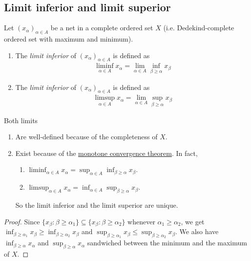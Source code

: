 \documentclass{treatise}
\begin{document}
\subsection{Limit inferior and limit superior}
Let $(x_\alpha)_{\alpha \in A}$ be a net in a complete ordered set $X$ (i.e. Dedekind-complete ordered set with maximum and minimum).
\begin{enumerate}
    \item The \emph{limit inferior} of $(x_\alpha)_{\alpha \in A}$ is defined as
    \begin{align*}
        \liminf_{\alpha \in A} x_\alpha = \lim_{\alpha \in A} \inf_{\beta \geq \alpha} x_\beta
    \end{align*}
    \item The \emph{limit inferior} of $(x_\alpha)_{\alpha \in A}$ is defined as
    \begin{align*}
        \limsup_{\alpha \in A} x_\alpha = \lim_{\alpha \in A} \sup_{\beta \geq \alpha} x_\beta
    \end{align*}
\end{enumerate}
\begin{remark}
Both limits
\begin{enumerate}
    \item Are well-defined because of the completeness of $X$.
    \item Exist because of the \hyperref[topo-ord-mono-conv]{monotone convergence theorem}. In fact,
    \begin{enumerate}
        \item $\liminf_{\alpha \in A} x_\alpha = \sup_{\alpha \in A} \inf_{\beta \geq \alpha} x_\beta$.
        \item $\limsup_{\alpha \in A} x_\alpha = \inf_{\alpha \in A} \sup_{\beta \geq \alpha} x_\beta$.
    \end{enumerate}
    So the limit inferior and the limit superior are unique.
\end{enumerate}
\begin{proof}
Since $\{ x_\beta : \beta \geq \alpha_1 \} \subseteq \{ x_\beta : \beta \geq \alpha_2 \}$ whenever $\alpha_1 \geq \alpha_2$, we get $\inf_{\beta \geq \alpha_1} x_\beta \geq \inf_{\beta \geq \alpha_2} x_\beta$ and $\sup_{\beta \geq \alpha_1} x_\beta \leq \sup_{\beta \geq \alpha_2} x_\beta$. We also have $\inf_{\beta \geq \alpha} x_\alpha$ and $\sup_{\beta \geq \alpha} x_\alpha$ sandwiched between the minimum and the maximum of $X$.
\end{proof}
\end{remark}
\end{document}
